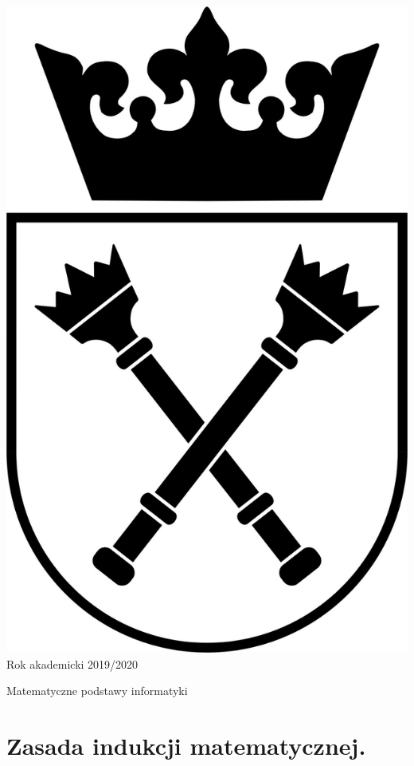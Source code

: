 \documentclass[12pt]{article}
\begin{document}
\begin{titlepage}
        \includegraphics[scale=0.27]{uj.jpg}\\[2cm]

        {\large Rok akademicki 2019/2020}\\

        \vfill
    \end{titlepage}

    \tableofcontents

    \newpage


    \begin{center}{\LARGE Matematyczne podstawy informatyki}\end{center}

    \section{Zasada indukcji matematycznej.}
\end{document}
